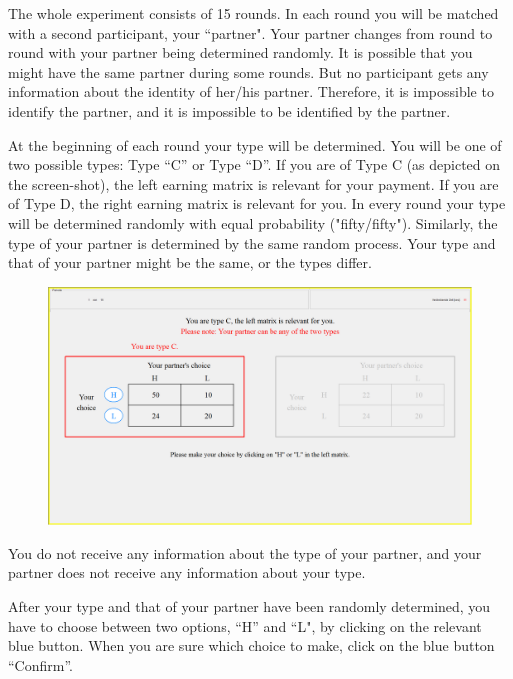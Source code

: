 \documentclass[12pt]{article}
\theoremstyle{break}
\begin{document}
The whole experiment consists of 15 rounds. In each round you will be matched with a second participant, your ``partner". Your partner changes from round to round with your partner being determined randomly. It is possible that you might have the same partner during some rounds. But no participant gets any information about the identity of her/his partner. Therefore, it is impossible to identify the partner, and it is impossible to be identified by the partner.

At the beginning of each round your type will be determined. You will be one of two possible types: Type “C” or Type “D”. If you are of Type C (as depicted on the screen-shot), the left earning matrix is relevant for your payment. If you are of Type D, the right earning matrix is relevant for you. In every round your type will be determined randomly with equal probability ("fifty/fifty"). Similarly, the type of your partner is determined by the same random process. Your type and that of your partner might be the same, or the types differ.
 

\begin{figure}[h]
  \centering
    \includegraphics[width=1\textwidth]{fig1-NC-instructions.png}
  \label{fig:fig1-NC-instructions}
\end{figure}




You do not receive any information about the type of your partner, and your partner does not receive any information about your type. 

After your type and that of your partner have been randomly determined, you have to choose between two options, ``H'' and ``L", by clicking on the relevant blue button. When you are sure which choice to make, click on the blue button ``Confirm''.
\end{document}
